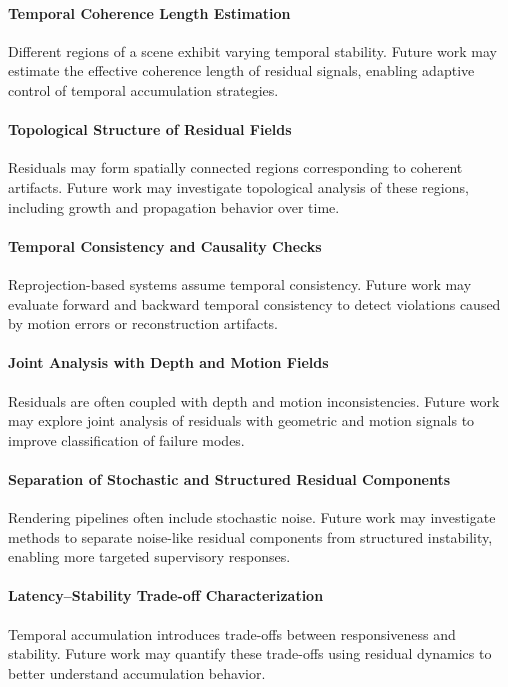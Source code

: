 \documentclass[11pt,letterpaper]{article}
\theoremstyle{gcresult}
\theoremstyle{definition}
\begin{document}
\paragraph{Temporal Coherence Length Estimation}
Different regions of a scene exhibit varying temporal stability. Future work may estimate the effective coherence length of residual signals, enabling adaptive control of temporal accumulation strategies.

\paragraph{Topological Structure of Residual Fields}
Residuals may form spatially connected regions corresponding to coherent artifacts. Future work may investigate topological analysis of these regions, including growth and propagation behavior over time.

\paragraph{Temporal Consistency and Causality Checks}
Reprojection-based systems assume temporal consistency. Future work may evaluate forward and backward temporal consistency to detect violations caused by motion errors or reconstruction artifacts.

\paragraph{Joint Analysis with Depth and Motion Fields}
Residuals are often coupled with depth and motion inconsistencies. Future work may explore joint analysis of residuals with geometric and motion signals to improve classification of failure modes.

\paragraph{Separation of Stochastic and Structured Residual Components}
Rendering pipelines often include stochastic noise. Future work may investigate methods to separate noise-like residual components from structured instability, enabling more targeted supervisory responses.

\paragraph{Latency–Stability Trade-off Characterization}
Temporal accumulation introduces trade-offs between responsiveness and stability. Future work may quantify these trade-offs using residual dynamics to better understand accumulation behavior.
\end{document}
